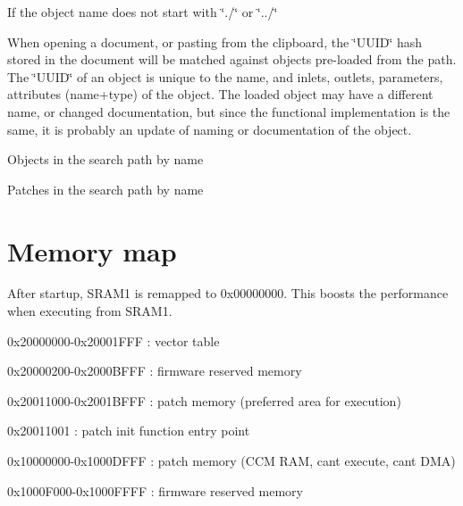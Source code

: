 If the object name does not start with \char`\"{}./\char`\"{} or \char`\"{}../\char`\"{} 
\begin{DoxyItemize}
\item When opening a document, or pasting from the clipboard, the \char`\"{}\+U\+U\+I\+D\char`\"{} hash stored in the document will be matched against objects pre-\/loaded from the path. The \char`\"{}\+U\+U\+I\+D\char`\"{} of an object is unique to the name, and inlets, outlets, parameters, attributes (name+type) of the object. The loaded object may have a different name, or changed documentation, but since the functional implementation is the same, it is probably an update of naming or documentation of the object. 
\item Objects in the search path by name 
\item Patches in the search path by name 
\end{DoxyItemize}\hypertarget{developers_developers_memory_map}{}\section{Memory map}\label{developers_developers_memory_map}
After startup, S\+R\+A\+M1 is remapped to 0x00000000. This boosts the performance when executing from S\+R\+A\+M1. 
\begin{DoxyItemize}
\item 0x20000000-\/0x20001\+F\+FF \+: vector table 
\item 0x20000200-\/0x2000\+B\+F\+FF \+: firmware reserved memory 
\item 0x20011000-\/0x2001\+B\+F\+FF \+: patch memory (preferred area for execution) 
\item 0x20011001 \+: patch init function entry point 
\item 0x10000000-\/0x1000\+D\+F\+FF \+: patch memory (C\+CM R\+AM, can\textquotesingle{}t execute, can\textquotesingle{}t D\+MA) 
\item 0x1000\+F000-\/0x1000\+F\+F\+FF \+: firmware reserved memory 
\end{DoxyItemize}

